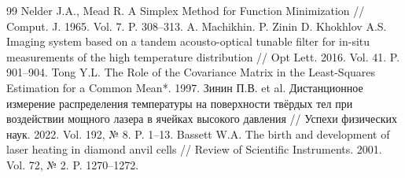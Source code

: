 \begin{thebibliography}{99}
Nelder J.A., Mead R. A Simplex Method for Function Minimization // Comput. J. 1965. Vol. 7. P. 308–313.
A. Machikhin. P. Zinin D. Khokhlov A.S. Imaging system based on a tandem acousto-optical tunable filter for in-situ measurements of the high temperature distribution // Opt Lett. 2016. Vol. 41. P. 901–904.
Tong Y.L. The Role of the Covariance Matrix in the Least-Squares Estimation for a Common Mean*. 1997.
Зинин П.В. et al. Дистанционное измерение распределения температуры на поверхности твёрдых тел при воздействии мощного лазера в ячейках высокого давления // Успехи физических наук. 2022. Vol. 192, № 8. P. 1–13.
Bassett W.A. The birth and development of laser heating in diamond anvil cells // Review of Scientific Instruments. 2001. Vol. 72, № 2. P. 1270–1272.
\end{thebibliography}


